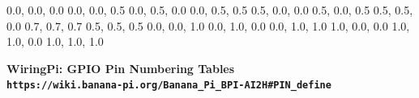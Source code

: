 \documentclass[11pt,a4paper]{article}
\begin{document}
\begin{sffamily}
\definecolor{rtb-black}{rgb}  {0.0, 0.0, 0.0}
\definecolor{rtb-navy}{rgb}   {0.0, 0.0, 0.5}
\definecolor{rtb-green}{rgb}  {0.0, 0.5, 0.0}
\definecolor{rtb-teal}{rgb}   {0.0, 0.5, 0.5}
\definecolor{rtb-maroon}{rgb} {0.5, 0.0, 0.0}
\definecolor{rtb-purple}{rgb} {0.5, 0.0, 0.5}
\definecolor{rtb-olive}{rgb}  {0.5, 0.5, 0.0}
\definecolor{rtb-silver}{rgb} {0.7, 0.7, 0.7}
\definecolor{rtb-grey}{rgb}   {0.5, 0.5, 0.5}
\definecolor{rtb-blue}{rgb}   {0.0, 0.0, 1.0}
\definecolor{rtb-lime}{rgb}   {0.0, 1.0, 0.0}
\definecolor{rtb-aqua}{rgb}   {0.0, 1.0, 1.0}
\definecolor{rtb-red}{rgb}    {1.0, 0.0, 0.0}
\definecolor{rtb-yellow}{rgb} {1.0, 1.0, 0.0}
\definecolor{rtb-white}{rgb}  {1.0, 1.0, 1.0}

\begin{center}
\bfseries{WiringPi: GPIO Pin Numbering Tables}\\
\tt{https://wiki.banana-pi.org/Banana_Pi_BPI-AI2H#PIN_define}
\end{center}


\end{sffamily}
\end{document}
